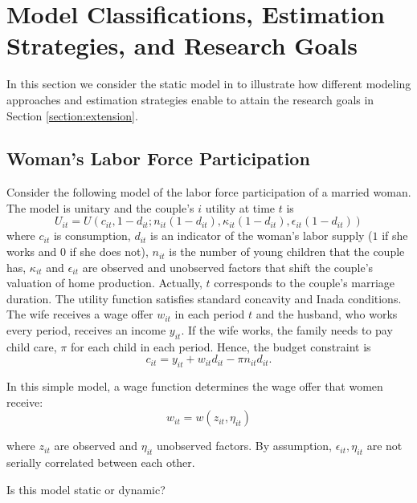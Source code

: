\section{Model Classifications, Estimation Strategies, and Research Goals} \label{section:models}
In this section we consider the static model in \citet{keane2011structural} to illustrate how different modeling approaches and estimation strategies enable to attain the research goals in Section \ref{section:extension}.
\subsection{Woman's Labor Force Participation} \label{section:model}
Consider the following model of the labor force participation of a married woman. The model is unitary and the couple's $i$ utility at time $t$ is
\begin{equation}
U_{it} = U \left( c_{it}, 1-d_{it}; n_{it}(1-d_{it}), \kappa_{it}(1-d_{it}), \epsilon_{it} (1-d_{it}) \right) \label{eq:utility}
\end{equation}
\noindent where $c_{it}$ is consumption, $d_{it}$ is an indicator of the woman's labor supply ($1$ if she works and $0$ if she does not), $n_{it}$ is the number of young children that the couple has, $\kappa_{it}$ and $\epsilon_{it}$ are observed and unobserved factors that shift the couple's valuation of home production. Actually, $t$ corresponds to the couple's marriage duration. The utility function satisfies standard concavity and Inada conditions.\\
\indent The wife receives a wage offer $w_{it}$ in each period $t$ and the husband, who works every period, receives an income $y_{it}$. If the wife works, the family needs to pay child care, $\pi$ for each child in each period. Hence, the budget constraint is
\begin{equation}
c_{it} = y_{it} + w_{it} d_{it} - \pi n_{it} d_{it} \label{eq:budget}.
\end{equation}

\indent In this simple model, a wage function determines the wage offer that women receive:
\begin{equation}
w_{it} = w(z_{it}, \eta_{it}) \label{eq:wage}
\end{equation} 

\noindent where $z_{it}$ are observed and $\eta_{it}$ unobserved factors. By assumption, $\epsilon_{it}, \eta_{it}$ are not serially correlated between each other.

\begin{exercise}
Is this model static or dynamic?
\end{exercise}

